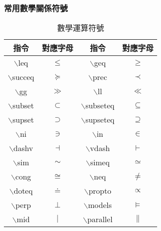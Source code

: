 \subsubsection{常用數學關係符號}
\begin{longtable}{c c c c}
    \caption{數學運算符號}\label{tb:sign} \\
     指令 & 對應字母 & 指令 & 對應字母 \\\hline 
     {\A $\backslash$leq} & $\leq$ & {\A $\backslash$geq} & $\geq$ \\
     {\A $\backslash$succeq}  & $\succeq$ & {\A $\backslash$prec} & $\prec$ \\
     {\A $\backslash$gg} & $\gg$	& {\A $\backslash$ll} & $\ll$ \\
     {\A $\backslash$subset} & $\subset$ & {\A $\backslash$subseteq} & $\subseteq$ \\
     {\A $\backslash$supset} & $\supset$ & {\A $\backslash$supseteq} & $\supseteq$ \\
     {\A $\backslash$ni} & $\ni$ & {\A $\backslash$in} & $\in$ \\
     {\A $\backslash$dashv} &  $\dashv$ & {\A $\backslash$vdash}  & $\vdash$ \\
     {\A $\backslash$sim} & $\sim$ & {\A $\backslash$simeq}  & $\simeq$ \\
     {\A $\backslash$cong} & $\cong$ & {\A $\backslash$neq} & $\neq$ \\
     {\A $\backslash$doteq} & $\doteq$ & {\A $\backslash$propto} & $\propto$ \\
     {\A $\backslash$perp} & $\perp$ & {\A $\backslash$models} & $\models$ \\
     {\A $\backslash$mid} & $\mid$ & {\A $\backslash$parallel} & $\parallel$ \\\hline
\end{longtable}


